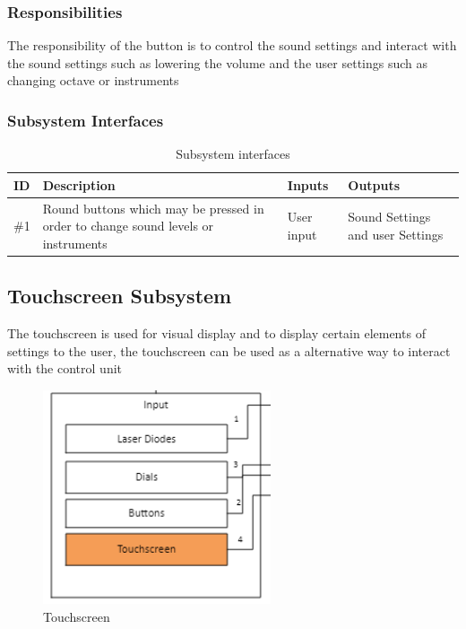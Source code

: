 \subsubsection{Responsibilities}
The responsibility of the button is to control the sound settings and interact with the sound settings such as lowering the volume and the user settings such as changing octave or instruments 


\subsubsection{Subsystem Interfaces}

\begin {table}[H]
\caption {Subsystem interfaces} 
\begin{center}
    \begin{tabular}{|  p{1cm}  |p{6cm}  |p{3cm}  |p{4cm}|}
    \hline
    ID & Description & Inputs & Outputs \\ \hline
    \#1& Round buttons which may be pressed in order to change sound levels or instruments& User input&       Sound Settings and user Settings\\\hline
    \end{tabular}
\end{center}
\end{table}

\subsection{Touchscreen Subsystem}
The touchscreen is used for visual display and to display certain elements of settings to the user, the touchscreen can be used as a alternative way to interact with the control unit


\begin{figure}[h!]
	\centering
 	\includegraphics[width=0.60\textwidth]{images/Touchscreen}
 \caption{Touchscreen}
\end{figure}

